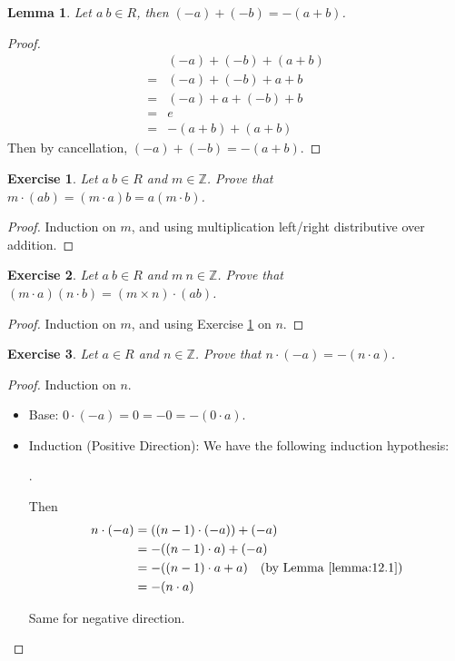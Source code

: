 \documentclass[14pt]{extarticle}
\newtheorem{lemma}{Lemma}[section]
\newtheorem{exercise}{Exercise}[section]
\newcommand{\1}{\{e\}}
\newcommand{\Z}{\mathbb{Z}}
\begin{document}
\begin{lemma}
  \label{lemma:12.1}
  Let $a \ b \in R$, then $(-a) + (-b) = -(a + b)$.
\end{lemma}
\begin{proof}
  \begin{align*}
     & (-a) + (-b) + (a + b) \\
    =& (-a) + (-b) + a + b \\
    =& (-a) + a + (-b) + b \\
    =& e \\
    =& - (a + b) + (a + b)
  \end{align*}
  Then by cancellation, $(-a) + (-b) = - (a + b)$.
\end{proof}

\setcounter{exercise}{13}
\begin{exercise}
  \label{exercise:12.14}
  Let $a \ b \in R$ and $m \in \Z$. Prove that $m \cdot (ab) = (m \cdot a)b = a (m \cdot b)$.
\end{exercise}
\begin{proof}
  Induction on $m$, and using multiplication left/right distributive over addition.
\end{proof}

\begin{exercise}
  Let $a \ b \in R$ and $m \ n \in \Z$. Prove that $(m \cdot a)(n \cdot b) = (m \times n) \cdot (ab)$.
\end{exercise}
\begin{proof}
  Induction on $m$, and using Exercise \ref{exercise:12.14} on $n$.
\end{proof}

\begin{exercise}
  Let $a \in R$ and $n \in \Z$. Prove that $n \cdot (-a) = - (n \cdot a)$.
\end{exercise}
\begin{proof}
  Induction on $n$.
  \begin{itemize}
    \item Base: $0 \cdot (-a) = 0 = -0 = - (0 \cdot a)$.
    \item Induction (Positive Direction): We have the following induction hypothesis:
      \begin{center}
        .
      \end{center}

      Then 
      \begin{align*}
        n \cdot (-a) &= ((n - 1) \cdot (-a)) + (-a) \\
        &= - ((n - 1) \cdot a) + (-a) \\
        &= - ((n - 1) \cdot a + a) \quad \text{(by Lemma \ref{lemma:12.1})} \\
        &= - (n \cdot a)
      \end{align*}

      Same for negative direction.
  \end{itemize}
\end{proof}
\end{document}
